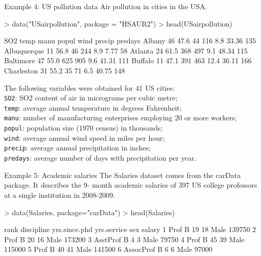 \documentclass[11pt,handout,aspectratio=169]{beamer}
\begin{document}
\begin{frame}[fragile]{Example 4: US pollution data}
Air pollution in cities in the USA. 
{\scriptsize
\begin{Schunk}
\begin{Sinput}
> data("USairpollution", package = "HSAUR2")
> head(USairpollution)
\end{Sinput}
\begin{Soutput}
            SO2 temp manu popul wind precip predays
Albany       46 47.6   44   116  8.8  33.36     135
Albuquerque  11 56.8   46   244  8.9   7.77      58
Atlanta      24 61.5  368   497  9.1  48.34     115
Baltimore    47 55.0  625   905  9.6  41.31     111
Buffalo      11 47.1  391   463 12.4  36.11     166
Charleston   31 55.2   35    71  6.5  40.75     148
\end{Soutput}
\end{Schunk}
The following variables were obtained for 41 US cities:\\
\texttt{SO2}: SO2 content of air in micrograms per cubic metre;\\
\texttt{temp}: average annual temperature in degrees Fahrenheit;\\
\texttt{manu}: number of manufacturing enterprises employing 20 or more workers;\\
\texttt{popul}: population size (1970 census) in thousands;\\
\texttt{wind}: average annual wind speed in miles per hour;\\
\texttt{precip}: average annual precipitation in inches;\\
\texttt{predays}: average number of days with precipitation per year.

}
\end{frame}

\begin{frame}[fragile]{Example 5: Academic salaries}
The Salaries dataset comes from the carData package. It describes the 9-
month academic salaries of 397 US college professors at a single institution in
2008-2009.
\scriptsize
\begin{Schunk}
\begin{Sinput}
> 	data(Salaries, package="carData")
> head(Salaries)
\end{Sinput}
\begin{Soutput}
       rank discipline yrs.since.phd yrs.service  sex salary
1      Prof          B            19          18 Male 139750
2      Prof          B            20          16 Male 173200
3  AsstProf          B             4           3 Male  79750
4      Prof          B            45          39 Male 115000
5      Prof          B            40          41 Male 141500
6 AssocProf          B             6           6 Male  97000
\end{Soutput}
\end{Schunk}
\end{frame}
\end{document}
